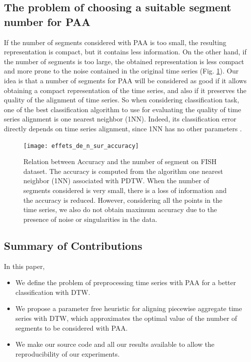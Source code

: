 \subsection{The problem of choosing a suitable segment number for PAA}

If the number of segments considered with PAA is too small, the resulting
representation  is compact, but it contains less information. On the other hand, if the number of
segments is too large, the obtained representation  is less compact and more prone to the noise
contained in the original time series (Fig. \ref{relation_nb_acc}). Our idea is that a number of
segments for PAA will be considered as good if it allows obtaining a compact representation of the
time series, and also if it preserves the quality of the alignment of time series. So when
considering classification task, one of the best classification algorithm to use for
evaluating the quality of time series alignment is one nearest neighbor (1NN).   
Indeed, its classification error directly depends on time series alignment, since 1NN has no other
parameters \cite{wang2013experimental}.


\begin{figure}
\center
\texttt{[image: effets\_de\_n\_sur\_accuracy]}
\caption{Relation between Accuracy and the number of segment on FISH dataset. The accuracy is computed from the algorithm one nearest neighbor (1NN) associated with PDTW. When the number of segments
considered is very small, there is a loss of information and the accuracy is reduced. However, considering all the points in the time series, we also do not obtain maximum accuracy due to the presence of noise or singularities \cite{Keogh_Pazzani_2001}  in the data. }
\label{relation_nb_acc}
\end{figure}

\subsection{Summary of Contributions}

In this paper, 
\begin{itemize}
\item We define the problem of preprocessing time series with PAA for a better classification with
DTW.
\item We propose a parameter free heuristic for aligning piecewise aggregate time series with DTW, which approximates the optimal value of the number of segments to be considered with PAA. 
\item  We make our source code and all our results available to allow the reproducibility of
our experiments.
\end{itemize}

